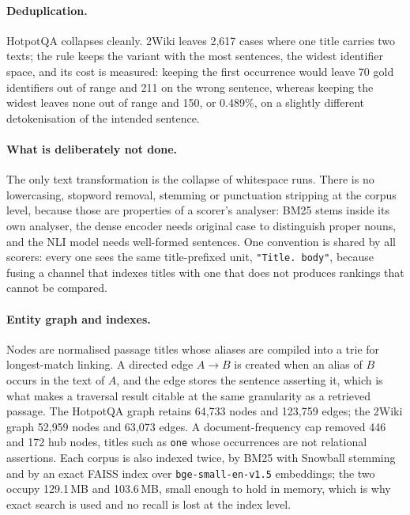 \paragraph{Deduplication.} HotpotQA collapses cleanly. 2Wiki leaves 2{,}617
cases where one title carries two texts; the rule keeps the variant with the
most sentences, the widest identifier space, and its cost is measured: keeping
the first occurrence would leave 70 gold identifiers out of range and 211 on
the wrong sentence, whereas keeping the widest leaves none out of range and 150,
or 0.489\%, on a slightly different detokenisation of the intended sentence.

\paragraph{What is deliberately not done.} The only text transformation is the
collapse of whitespace runs. There is no lowercasing, stopword removal,
stemming or punctuation stripping at the corpus level, because those are
properties of a scorer's analyser: BM25 stems inside its own analyser, the
dense encoder needs original case to distinguish proper nouns, and the NLI
model needs well-formed sentences. One convention is shared by all scorers:
every one sees the same title-prefixed unit, \texttt{"Title. body"}, because
fusing a channel that indexes titles with one that does not produces rankings
that cannot be compared.

\paragraph{Entity graph and indexes.} Nodes are normalised passage titles
whose aliases are compiled into a trie for longest-match linking. A directed
edge $A \to B$ is created when an alias of $B$ occurs in the text of $A$, and
the edge stores the sentence asserting it, which is what makes a traversal
result citable at the same granularity as a retrieved passage. The HotpotQA
graph retains 64{,}733 nodes and 123{,}759 edges; the 2Wiki graph 52{,}959
nodes and 63{,}073 edges. A document-frequency cap removed 446 and 172 hub
nodes, titles such as \texttt{one} whose occurrences are not relational
assertions. Each corpus is also indexed twice, by BM25 with Snowball stemming
and by an exact FAISS index over \texttt{bge-small-en-v1.5} embeddings; the
two occupy 129.1\,MB and 103.6\,MB, small enough to hold in memory, which is
why exact search is used and no recall is lost at the index level.

